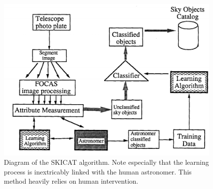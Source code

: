\documentclass[a4paper,11pt]{article}
\begin{document}
\begin{figure}[ht]
\centering
\includegraphics[width=\textwidth]{SkICAT.png}
\caption{\label{fig:SkiCAT}Diagram of the SKICAT algorithm. Note especially that the learning process is inextricably linked with the human astronomer. This method heavily relies on human intervention. \cite{fayyad_1993_applying}}
\end{figure}
\end{document}
